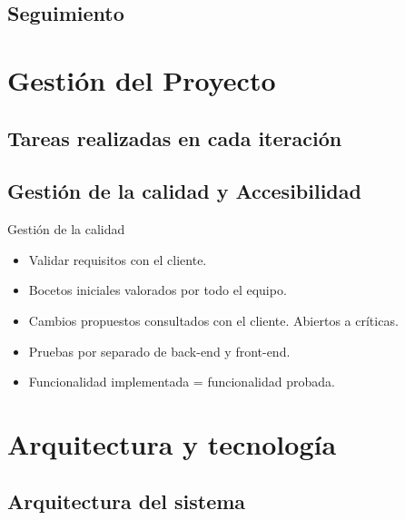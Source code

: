 \documentclass{beamer}
\begin{document}
\subsection{Seguimiento}

\section{Gesti\'on del Proyecto}

\subsection{Tareas realizadas en cada iteraci\'on}

\subsection{Gesti\'on de la calidad y Accesibilidad}
	\begin{frame}{Gesti\'on de la calidad}
		\begin{itemize}
			\item {
				Validar requisitos con el cliente.
			}
			\item {
				Bocetos iniciales valorados por todo el equipo.
			}
			\item {
				Cambios propuestos consultados con el cliente. Abiertos a cr\'iticas.
			}
			\item {
				Pruebas por separado de back-end y front-end.
			}
			\item {
				Funcionalidad implementada = funcionalidad probada.
				
			}
		\end{itemize}
		
		
		\begin{figure}
    		\hspace{0.7cm}
		\end{figure}
	
	\end{frame}

\section{Arquitectura y tecnolog\'ia}

\subsection{Arquitectura del sistema}
\end{document}
